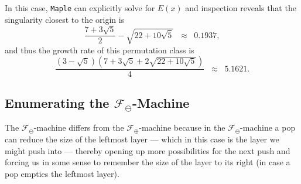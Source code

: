 \documentclass[10pt]{article}
\theoremstyle{plain}
\theoremstyle{definition}
\newcommand{\F}{\mathcal{F}}
\begin{document}
In this case, \texttt{Maple} can explicitly solve for $E(x)$ and inspection reveals that the singularity closest to the origin is
\[
	\frac{7+3\sqrt{5}}{2} - \sqrt{22+10\sqrt{5}} \;\;\approx\;\; 0.1937,
\]
and thus the growth rate of this permutation class is
\[
	\frac{\left(3-\sqrt{5}\right)\left(7 + 3\sqrt{5} + 2\sqrt{22+10\sqrt{5}}\right)}{4} \;\;\approx\;\; 5.1621.
\]

%


\subsection{Enumerating the $\F_\ominus$-Machine}

The $\F_\ominus$-machine differs from the $\F_\oplus$-machine because in the $\F_\ominus$-machine a pop can reduce the size of the leftmost layer --- which in this case is the layer we might push into --- thereby opening up more possibilities for the next push and forcing us in some sense to remember the size of the layer to its right (in case a pop empties the leftmost layer).
\end{document}
